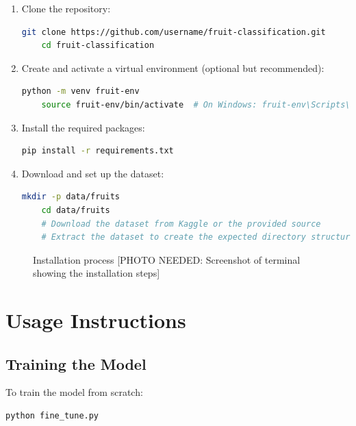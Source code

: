 \documentclass[11pt,a4paper]{report}
\begin{document}
\begin{enumerate}
    \item Clone the repository:
    \begin{lstlisting}[language=bash]
    git clone https://github.com/username/fruit-classification.git
    cd fruit-classification
    \end{lstlisting}

    \item Create and activate a virtual environment (optional but recommended):
    \begin{lstlisting}[language=bash]
    python -m venv fruit-env
    source fruit-env/bin/activate  # On Windows: fruit-env\Scripts\activate
    \end{lstlisting}

    \item Install the required packages:
    \begin{lstlisting}[language=bash]
    pip install -r requirements.txt
    \end{lstlisting}

    \item Download and set up the dataset:
    \begin{lstlisting}[language=bash]
    mkdir -p data/fruits
    cd data/fruits
    # Download the dataset from Kaggle or the provided source
    # Extract the dataset to create the expected directory structure
    \end{lstlisting}
\end{enumerate}

\begin{figure}[H]
    \centering
    \fbox{\rule{0pt}{8cm}\rule{12cm}{0pt}}
    \caption{Installation process [PHOTO NEEDED: Screenshot of terminal showing the installation steps]}
    \label{fig:installation}
\end{figure}

\chapter{Usage Instructions}

\section{Training the Model}
To train the model from scratch:

\begin{lstlisting}[language=bash]
python fine_tune.py
\end{lstlisting}
\end{document}
